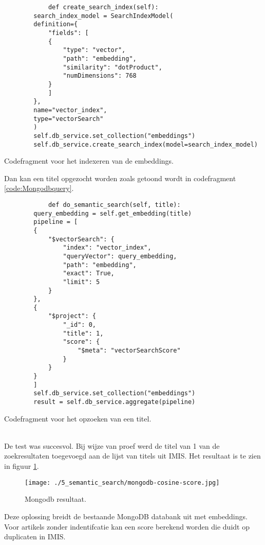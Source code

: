 \begin{listing}
    \begin{verbatim}
            def create_search_index(self):
        search_index_model = SearchIndexModel(
        definition={
            "fields": [
            {
                "type": "vector",
                "path": "embedding",
                "similarity": "dotProduct",
                "numDimensions": 768
            }
            ]
        },
        name="vector_index",
        type="vectorSearch"
        )
        self.db_service.set_collection("embeddings")
        self.db_service.create_search_index(model=search_index_model)
    \end{verbatim}
    \caption[Index codefragment]{Codefragment voor het indexeren van de embeddings.}
    \label{code:Mongodbindex}
\end{listing}
Dan kan een titel opgezocht worden zoals getoond wordt in codefragment \ref{code:Mongodbquery}.
\begin{listing}
    \begin{verbatim}
            def do_semantic_search(self, title):
        query_embedding = self.get_embedding(title)
        pipeline = [
        {
            "$vectorSearch": {
                "index": "vector_index",
                "queryVector": query_embedding,
                "path": "embedding",
                "exact": True,
                "limit": 5
            }
        },
        {
            "$project": {
                "_id": 0,
                "title": 1,
                "score": {
                    "$meta": "vectorSearchScore"
                }
            }
        }
        ]
        self.db_service.set_collection("embeddings")
        result = self.db_service.aggregate(pipeline)
    \end{verbatim}
    \caption[Query codefragment]{Codefragment voor het opzoeken van een titel.}
    \label{code:Mongodbquery}
\end{listing}
\\
De test was succesvol. Bij wijze van proef werd de titel van 1 van de zoekresultaten toegevoegd aan de lijst van titels uit IMIS. Het resultaat is te zien in figuur \ref{fig:Mongodb}.
\begin{figure}
    \centering
    \texttt{[image: ./5\_semantic\_search/mongodb-cosine-score.jpg]}
    \caption[Mongodb resultaat.]{\label{fig:Mongodb}Mongodb resultaat.}
\end{figure}
Deze oplossing breidt de bestaande MongoDB databank uit met embeddings. Voor artikels zonder indentifcatie kan een score berekend worden die duidt op duplicaten in IMIS. 
